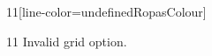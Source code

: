 \documentclass[paper=A4]{ropas-poster}
\begin{document}
\begin{postergrid}{1}{1}[line-color=undefinedRopasColour]
\begin{posterblock}{1}{1}
Invalid grid option.
\end{posterblock}
\end{postergrid}
\end{document}
